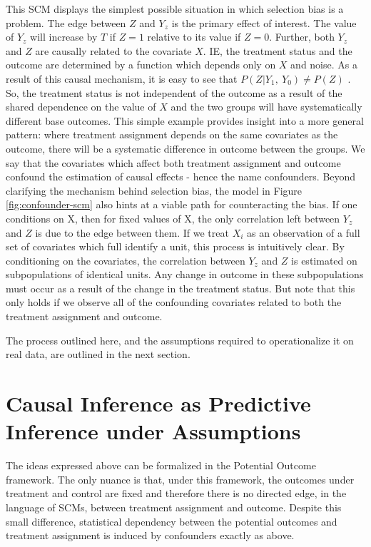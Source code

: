 \documentclass[../main.tex]{subfiles}
\begin{document}
This SCM displays the simplest possible situation in which selection bias is a problem. The edge between  \( Z \) and  \( Y_{z} \) is the primary effect of interest. The value of  \( Y_{z} \) will increase by  \( T \) if  \( Z=1 \) relative to its value if  \( Z=0 \). Further, both  \( Y_{z} \) and  \( Z \) are causally related to the covariate  \( X. \)  IE, the treatment status and the outcome are determined by a function which depends only on  \( X \) and noise. As a result of this causal mechanism, it is easy to see that \( P \left( Z  \vert  Y_{1},~Y_{0} \right)   \neq  P \left( Z \right)  \) . So, the treatment status is not independent of the outcome as a result of the shared dependence on the value of  \( X \) and the two groups will have systematically different base outcomes. This simple example provides insight into a more general pattern: where treatment assignment depends on the same covariates as the outcome, there will be a systematic difference in outcome between the groups. We say that the covariates which affect both treatment assignment and outcome confound the estimation of causal effects - hence the name confounders. Beyond clarifying the mechanism behind selection bias, the model in Figure \ref{fig:confounder-scm} also hints at a viable path for counteracting the bias. If one conditions on X, then for fixed values of X, the only correlation left between  \( Y_{z} \) and  \( Z \)  is due to the edge between them. If we treat  \( X_{i} \) as an observation of a full set of covariates which full identify a unit, this process is intuitively clear. By conditioning on the covariates, the correlation between  \( Y_{z} \) and  \( Z \) is estimated on subpopulations of identical units. Any change in outcome in these subpopulations must occur as a result of the change in the treatment status. But note that this only holds if we observe all of the confounding covariates related to both the treatment assignment and outcome.\par


\vspace{\baselineskip}
The process outlined here, and the assumptions required to operationalize it on real data, are outlined in the next section.\par

\section{Causal Inference as Predictive Inference under Assumptions}

\vspace{\baselineskip}
The ideas expressed above can be formalized in the Potential Outcome framework. The only nuance is that, under this framework, the outcomes under treatment and control are fixed and therefore there is no directed edge, in the language of SCMs, between treatment assignment and outcome. Despite this small difference, statistical dependency between the potential outcomes and treatment assignment is induced by confounders exactly as above.\par
\end{document}
